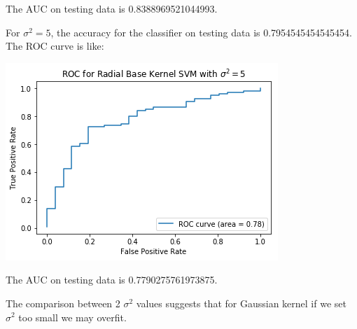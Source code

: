 \documentclass[paper=letter, fontsize=12pt]{article}
\begin{document}
\begin{enumerate}[label=(\alph*)]
	The AUC on testing data is 0.8388969521044993.
	
	For $\sigma^2 = 5$, the accuracy for the classifier on testing data is 0.7954545454545454. The ROC curve is like:
	
	\includegraphics[scale=0.6]{q4c2.png}

	The AUC on testing data is 0.7790275761973875.
	
	The comparison between 2 $\sigma^2$ values suggests that for Gaussian kernel if we set $\sigma^2$ too small we may overfit.
\end{enumerate}
\end{document}
